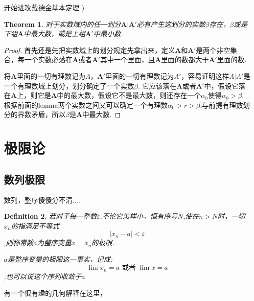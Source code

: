 \documentclass{article}
\newtheorem{theorem}{Theorem}[section]
\newtheorem{definition}[theorem]{Definition}
\begin{document}
开始进攻戴德金基本定理 )

\begin{theorem}
对于实数域内的任一划分$\textbf{A}| \textbf{A}'$必有产生这划分的实数$\beta$存在，$\beta$或是下组$\textbf{A}$中最大数，或是上组$\textbf{A}'$中最小数.	
\end{theorem}

\begin{proof}
首先还是先把实数域上的划分规定先拿出来，定义$\textbf{A}$和$\textbf{A}'$是两个非空集合，每一个实数必落在$\textbf{A}$或者$\textbf{A}'$其中一个里面，且$\textbf{A}$里面的数都大于$\textbf{A}'$里面的数.

将$\textbf{A}$里面的一切有理数记为$A$，$\textbf{A}'$里面的一切有理数记为$A'$，容易证明这样$A|A'$是一个有理数域上划分，划分确定了一个实数$\beta$. 它应该落在$\textbf{A}$或者$\textbf{A}'$中，假设它落在$\textbf{A}$上，则它是$\textbf{A}$中的最大数，假设它不是最大数，则还存在一个$\alpha_0$使得$\alpha_0 > \beta$,根据前面的lemma两个实数之间又可以确定一个有理数$\alpha_0 > r > \beta$,与前提有理数划分的界数矛盾，所以$\beta$是$\textbf{A}$中最大数.
\end{proof}

\newpage
\section{极限论}
\subsection{数列极限}
数列，整序傻傻分不清....

\begin{definition}
若对于每一整数$\varepsilon$,不论它怎样小，恒有序号$N$,使在$n > N$时，一切$x_n$的指满足不等式\[|x_n-a| < \varepsilon\],则称常数$a$为整序变量$x=x_n$的极限.

$a$是整序变量的极限这一事实，记成:\[\lim x_n =a \text{ 或者 } \lim x = a\],也可以说这个序列收敛于$a$
\end{definition}

有一个很有趣的几何解释在这里，

\begin{center}
\end{center}
\end{document}
